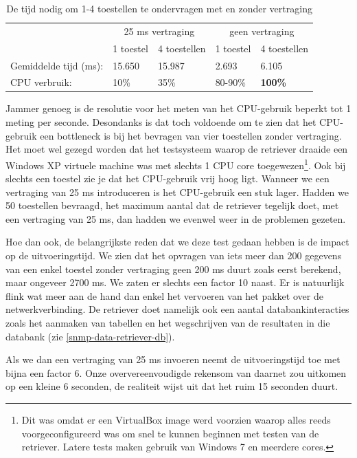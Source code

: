 \begin{table}[h]
\centering
\begin{tabular}{@{}lllll@{}}
\toprule
                      & \multicolumn{2}{c}{25 ms vertraging} & \multicolumn{2}{c}{geen vertraging} \\
                      & 1 toestel       & 4 toestellen       & 1 toestel       & 4 toestellen      \\ \midrule
Gemiddelde tijd (ms): & 15.650          & 15.987             & 2.693           & 6.105             \\
CPU verbruik:         & 10\%            & 35\%               & 80-90\%         & \textbf{100\%}    \\ \bottomrule
\end{tabular}
\caption{De tijd nodig om 1-4 toestellen te ondervragen met en zonder vertraging}
\label{tabel-latency}
\end{table}

Jammer genoeg is de resolutie voor het meten van het CPU-gebruik beperkt tot 1 meting per seconde.
Desondanks is dat toch voldoende om te zien dat het CPU-gebruik een bottleneck is bij het bevragen van vier toestellen zonder vertraging.
Het moet wel gezegd worden dat het testsysteem waarop de retriever draaide een Windows XP virtuele machine was met slechts 1 CPU core toegewezen\footnote{
	Dit was omdat er een VirtualBox image werd voorzien waarop alles reeds voorgeconfigureerd was om snel te kunnen beginnen met testen van de retriever.
	Latere tests maken gebruik van Windows 7 en meerdere cores.
}.
Ook bij slechts een toestel zie je dat het CPU-gebruik vrij hoog ligt.
Wanneer we een vertraging van 25 ms introduceren is het CPU-gebruik een stuk lager.
Hadden we 50 toestellen bevraagd, het maximum aantal dat de retriever tegelijk doet, met een vertraging van 25 ms, dan hadden we evenwel weer in de problemen gezeten.

Hoe dan ook, de belangrijkste reden dat we deze test gedaan hebben is de impact op de uitvoeringstijd.
We zien dat het opvragen van iets meer dan 200 gegevens van een enkel toestel zonder vertraging geen 200 ms duurt zoals eerst berekend,
maar ongeveer 2700 ms.
We zaten er slechts een factor 10 naast.
Er is natuurlijk flink wat meer aan de hand dan enkel het vervoeren van het pakket over de netwerkverbinding.
De retriever doet namelijk ook een aantal databankinteracties zoals het aanmaken van tabellen en
het wegschrijven van de resultaten in die databank (zie \cref{snmp-data-retriever-db}).

Als we dan een vertraging van 25 ms invoeren neemt de uitvoeringstijd toe met bijna een factor 6.
Onze oververeenvoudigde rekensom van daarnet zou uitkomen op een kleine 6 seconden, de realiteit wijst uit dat het ruim 15 seconden duurt.

